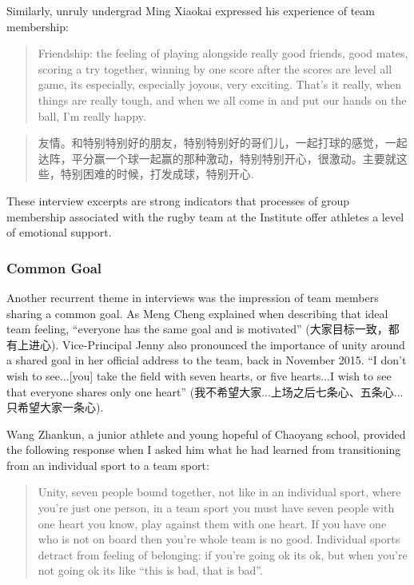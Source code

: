 \begin{CJK}{UTF8}{gbsn}
Similarly, unruly undergrad Ming Xiaokai expressed his experience of team membership:

    \begin{quotation}
      Friendship: the feeling of playing alongside really good friends, good mates, scoring a try together, winning by one score after the scores are level all game, its especially, especially joyous, very exciting.  That's it really, when things are really tough, and when we all come in and put our hands on the ball, I’m really happy.
    \end{quotation}

    \begin{quotation}
       友情。和特别特别好的朋友，特别特别好的哥们儿，一起打球的感觉，一起达阵，平分赢一个球一起赢的那种激动，特别特别开心，很激动。主要就这些，特别困难的时候，打发成球，特别开心.
    \end{quotation}


These interview excerpts are strong indicators that processes of group membership associated with the rugby team at the Institute offer athletes a level of emotional support.



\subsubsection{Common Goal}

Another recurrent theme in interviews was the impression of team members sharing a common goal.  As Meng Cheng explained when describing that ideal team feeling, ``everyone has the same goal and is motivated'' (大家目标一致，都有上进心). Vice-Principal Jenny also pronounced the importance of unity around a shared goal in her official address to the team, back in November 2015.  ``I don't wish to see...[you] take the field with seven hearts, or five hearts...I wish to see that everyone shares only one heart'' (我不希望大家...上场之后七条心、五条心...只希望大家一条心).

Wang Zhankun, a junior athlete and young hopeful of Chaoyang school, provided the following response when I asked him what he had learned from transitioning from an individual sport to a team sport:

  \begin{quotation}
    Unity, seven people bound together, not like in an individual sport, where you’re just one person, in a team sport you must have seven people with one heart you know, play against them with one heart.  If you have one who is not on board then you’re whole team is no good. Individual sports detract from feeling of belonging: if you’re going ok its ok, but when you’re not going ok its like ``this is bad, that is bad''.
  \end{quotation}


\end{CJK}
